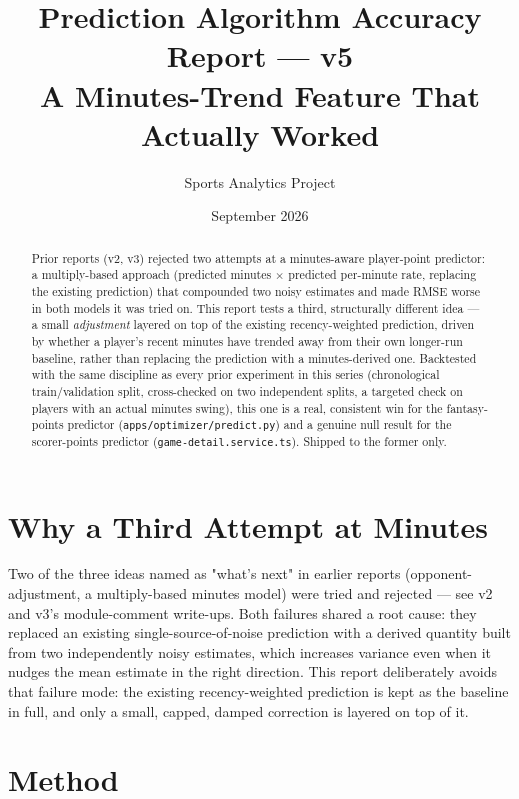 \documentclass[11pt]{article}
\title{\textbf{Prediction Algorithm Accuracy Report — v5} \\ \large A Minutes-Trend Feature That Actually Worked}
\author{Sports Analytics Project}
\date{September 2026}
\newcommand{\code}[1]{\allowbreak\texttt{\small #1}\allowbreak}
\begin{document}
\maketitle

\begin{abstract}
\noindent Prior reports (v2, v3) rejected two attempts at a minutes-aware player-point predictor: a
multiply-based approach (predicted minutes $\times$ predicted per-minute rate, replacing the existing
prediction) that compounded two noisy estimates and made RMSE worse in both models it was tried on. This
report tests a third, structurally different idea — a small \emph{adjustment} layered on top of the existing
recency-weighted prediction, driven by whether a player's recent minutes have trended away from their own
longer-run baseline, rather than replacing the prediction with a minutes-derived one. Backtested with the
same discipline as every prior experiment in this series (chronological train/validation split, cross-checked
on two independent splits, a targeted check on players with an actual minutes swing), this one is a real,
consistent win for the fantasy-points predictor (\code{apps/optimizer/predict.py}) and a genuine null result
for the scorer-points predictor (\code{game-detail.service.ts}). Shipped to the former only.
\end{abstract}

\tableofcontents

\section{Why a Third Attempt at Minutes}

Two of the three ideas named as "what's next" in earlier reports (opponent-adjustment, a multiply-based
minutes model) were tried and rejected — see v2 and v3's module-comment write-ups. Both failures shared a
root cause: they replaced an existing single-source-of-noise prediction with a derived quantity built from
two independently noisy estimates, which increases variance even when it nudges the mean estimate in the
right direction. This report deliberately avoids that failure mode: the existing recency-weighted prediction
is kept as the baseline in full, and only a small, capped, damped correction is layered on top of it.

\section{Method}
\end{document}
